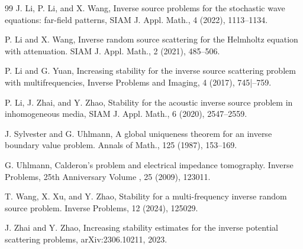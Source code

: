 \documentclass[reqno, 12pt]{amsart}
\numberwithin{equation}{section}
\begin{document}
\begin{thebibliography}{99}
J. Li, P. Li, and X. Wang, Inverse source problems for the stochastic wave equations: far-field
patterns, SIAM J. Appl. Math., 4 (2022), 1113--1134.

P. Li and X. Wang, Inverse random source scattering for the Helmholtz equation with attenuation.
SIAM J. Appl. Math., 2 (2021), 485--506.

P. Li and G. Yuan, Increasing stability for the inverse source scattering problem with multifrequencies,
Inverse Problems and Imaging, 4 (2017), 745|--759.

P. Li, J. Zhai, and Y. Zhao, Stability for the acoustic inverse source problem in inhomogeneous media,
SIAM J. Appl. Math., 6 (2020), 2547--2559.


J. Sylvester and G. Uhlmann, A global uniqueness theorem for an inverse boundary value problem. Annals of Math., 125 (1987), 153--169.


G. Uhlmann, Calderon's problem and electrical impedance tomography. Inverse Problems, 25th Anniversary Volume , 25 (2009), 123011.

T. Wang, X. Xu, and Y. Zhao, Stability for a multi-frequency inverse random source problem.
Inverse Problems, 12 (2024), 125029.

J. Zhai and Y. Zhao, Increasing stability estimates for the inverse potential scattering problems,
arXiv:2306.10211, 2023.



\end{thebibliography}
\end{document}
